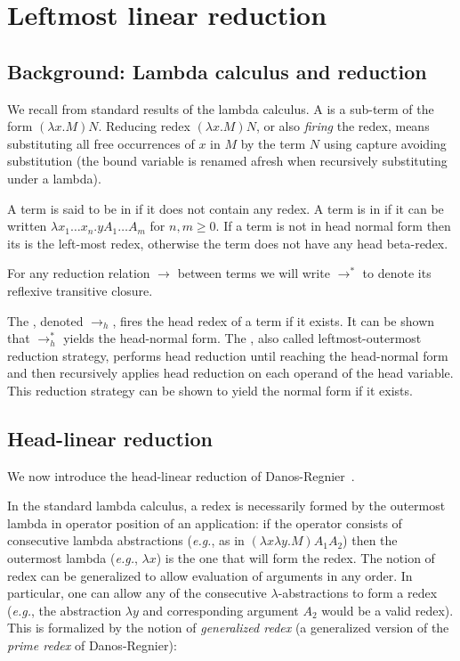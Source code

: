 \documentclass{article}
\makeatletter
\theoremstyle{definition}
\renewcommand\eg{{\it e.g.\@\xspace}}
\makeatother
\begin{document}
\section{Leftmost linear reduction}
\label{sec:leftmostlinearred}

\subsection{Background: Lambda calculus and reduction}
We recall from standard results of the lambda calculus.
A  is a sub-term of the form $(\lambda x. M) N$.
Reducing redex $(\lambda x. M) N$, or also \emph{firing} the redex, means substituting all free occurrences of $x$ in $M$ by the term $N$ using capture avoiding substitution (the bound variable is renamed afresh when recursively substituting under a lambda).

A term is said to be in  if it does not contain any redex.
A term is in  if it can be written $\lambda x_1 \ldots x_n . y A_1 \ldots A_m$ for $n,m\geq0$. If a term is not in head normal form then its  is the left-most redex, otherwise the term does not have any head beta-redex.

For any reduction relation $\rightarrow$ between terms we will write
$\rightarrow^*$ to denote its reflexive transitive closure.

The , denoted $\rightarrow_{h}$, fires the head redex of a term if it exists. It can be shown that $\rightarrow^*_{h}$ yields the head-normal form. The , also called leftmost-outermost reduction strategy, performs head reduction until reaching the head-normal form and then recursively applies head reduction on each operand of the head variable. This reduction strategy can be shown to yield the normal form if it exists.


\subsection{Head-linear reduction}
We now introduce the head-linear reduction of Danos-Regnier~\cite{danos-head}.

In the standard lambda calculus, a redex is necessarily formed by the outermost lambda in operator position of an application: if the operator consists of consecutive lambda abstractions (\eg, as in $(\lambda x \lambda y . M) A_1 A_2$) then the outermost lambda (\eg, $\lambda x$) is the one that will form the redex. The notion of redex can be generalized to allow evaluation of arguments in any order. In particular, one can allow any of the consecutive $\lambda$-abstractions to form a redex (\eg, the abstraction $\lambda y$ and corresponding argument $A_2$ would be a valid redex). This is formalized by the notion of \emph{generalized redex} (a generalized version of the \emph{prime redex} of Danos-Regnier):
\end{document}
